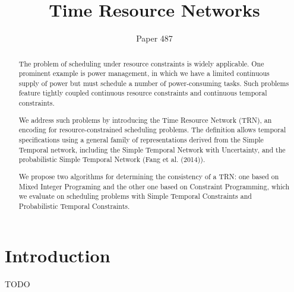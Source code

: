 \documentclass{article}
\title{Time Resource Networks}
\author{Paper 487}
\begin{document}
\maketitle

\begin{abstract}
  The problem of scheduling under resource constraints is widely applicable. One prominent example is power management, in which we have a limited continuous supply of power but must schedule a number of power-consuming tasks. Such problems feature tightly coupled continuous resource constraints and continuous temporal constraints.

  We address such problems by introducing the Time Resource Network (TRN), an encoding for resource-constrained scheduling problems. The definition allows temporal specifications using a general family of representations derived from the Simple Temporal network, including the Simple Temporal Network with Uncertainty, and the probabilistic Simple Temporal Network (Fang et al. (2014)).

  We propose two algorithms for determining the consistency of a TRN: one based on Mixed Integer Programing and the other one based on Constraint Programming, which we evaluate on scheduling problems with Simple Temporal Constraints and Probabilistic Temporal Constraints.
\end{abstract}

\section{Introduction}
TODO










\end{document}
